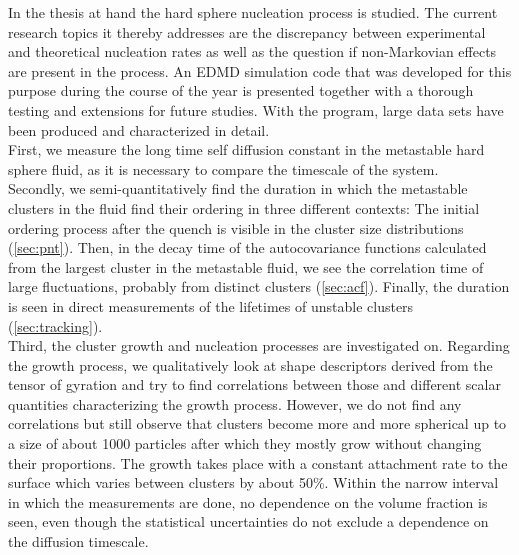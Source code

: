
\label{sec:conclusion}
In the thesis at hand the hard sphere nucleation process is studied. The current research topics it thereby addresses are the discrepancy between experimental and theoretical nucleation rates as well as the question if non-Markovian effects are present in the process. An EDMD simulation code that was developed for this purpose during the course of the year is presented together with a thorough testing and extensions for future studies. With the program, large data sets have been produced and characterized in detail.\\

First, we measure the long time self diffusion constant in the metastable hard sphere fluid, as it is necessary to compare the timescale of the system.\\

Secondly, we semi-quantitatively find the duration in which the metastable
clusters in the fluid find their ordering in three different contexts: The initial ordering process after the quench is visible in the cluster size distributions (\autoref{sec:pnt}). Then, in the decay time of the autocovariance functions calculated from the largest cluster in the metastable fluid, we see the correlation time of large fluctuations, probably from distinct clusters (\autoref{sec:acf}). Finally, the duration is seen in direct measurements of the lifetimes of unstable clusters (\autoref{sec:tracking}).\\

Third, the cluster growth and nucleation processes are investigated on. Regarding the growth process, we qualitatively look at shape descriptors derived from the tensor of gyration and try to find correlations between those and different scalar quantities characterizing the growth process. However, we do not find any correlations but still observe that clusters become more and more spherical up to a size of about 1000 particles after which they mostly grow without changing their proportions. The growth takes place with a constant attachment rate to the surface which varies between clusters by about 50\%. Within the narrow interval in which the measurements are done, no dependence on the volume fraction is seen, even though the statistical uncertainties do not exclude a dependence on the diffusion timescale.\\

